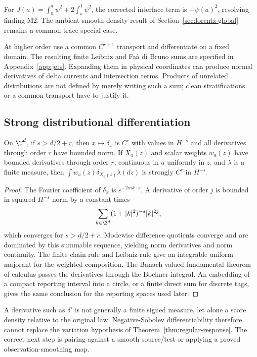 For $J(a)=\int_0^a\psi^2+2\int_a^1\psi^2$, the corrected interface term is $-\psi(a)^2$, resolving finding M2. The ambient smooth-density result of Section~\ref{sec:lorentz-global} remains a common-trace special case.

At higher order use a common $C^{r+1}$ transport and differentiate on a fixed domain. The resulting finite Leibniz and Fa\`a di Bruno sums are specified in Appendix~\ref{app:jets}. Expanding them in physical coordinates can produce normal derivatives of delta currents and intersection terms. Products of unrelated distributions are not defined by merely writing such a sum; clean stratifications or a common transport have to justify it.

\subsection{Strong distributional differentiation}
\begin{lemma}\label{lem:dirac}
On $\T^d$, if $s>d/2+r$, then $x\mapsto\delta_x$ is $C^r$ with values in $H^{-s}$ and all derivatives through order $r$ have bounded norm. If $X_a(z)$ and scalar weights $w_a(z)$ have bounded derivatives through order $r$, continuous in $a$ uniformly in $z$, and $\lambda$ is a finite measure, then
$\int w_a(z)\delta_{X_a(z)}\lambda(dz)$ is strongly $C^r$ in $H^{-s}$.
\end{lemma}
\begin{proof}
The Fourier coefficient of $\delta_x$ is $e^{-2\pi ik\cdot x}$. A derivative of order $j$ is bounded in squared $H^{-s}$ norm by a constant times
\[
 \sum_{k\in\Z^d}(1+|k|^2)^{-s}|k|^{2j},
\]
which converges for $s>d/2+r$. Modewise difference quotients converge and are dominated by this summable sequence, yielding norm derivatives and norm continuity. The finite chain rule and Leibniz rule give an integrable uniform majorant for the weighted composition. The Banach-valued fundamental theorem of calculus passes the derivatives through the Bochner integral. An embedding of a compact reporting interval into a circle, or a finite direct sum for discrete tags, gives the same conclusion for the reporting spaces used later.
\end{proof}

A derivative such as $\delta'$ is not generally a finite signed measure, let alone a score density relative to the original law. Negative-Sobolev differentiability therefore cannot replace the variation hypothesis of Theorem~\ref{thm:regular-response}. The correct next step is pairing against a smooth source/test or applying a proved observation-smoothing map.

